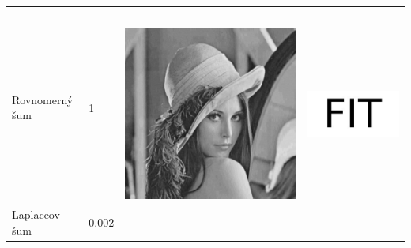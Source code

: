 \begin{table}[h]
\begin{tabular}{llcc}
\begin{minipage}[c]{.15\textwidth}
\end{minipage}  \\
Rovnomerný šum                         &  1 & 
\begin{minipage}[c]{.1\textwidth}
\ 
  \includegraphics[scale=0.1]{obrazky/UniformNoise}
\end{minipage} & 
\begin{minipage}[c]{.15\textwidth}
\ 
  \includegraphics[scale=0.25]{obrazky/UniformNoise-wm}
\end{minipage}  \\
Laplaceov šum                          & 0.002 & 
\begin{minipage}[c]{.1\textwidth}
\ 

\end{minipage}
\end{tabular}
\end{table}
